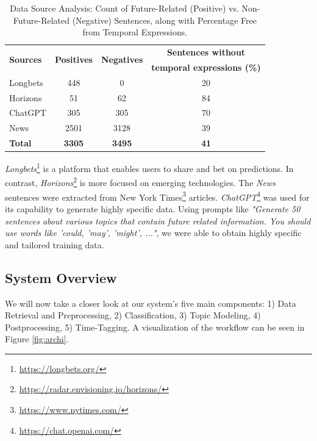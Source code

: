 \documentclass[sigconf]{acmart}
\begin{document}
\vspace*{-0.1cm}

\begin{table}[h]
  \begin{tabular}{lccc}
    \toprule
    \multirow{2}{*}{\textbf{Sources}} & \multirow{2}{*}{\textbf{Positives}} & \multirow{2}{*}{\textbf{Negatives}} & \textbf{Sentences without} \\
    & & & \textbf{temporal expressions (\%)} \\
    \midrule
    Longbets & 448 & 0 & 20 \\
    Horizons & 51 & 62 & 84 \\
    ChatGPT & 305 & 305 & 70 \\
    News & 2501 & 3128 & 39 \\
    \bottomrule
    \textbf{Total} & \textbf{3305} & \textbf{3495} & \textbf{41} \\
  \bottomrule
  \end{tabular}
  \caption{Data Source Analysis: Count of Future-Related (Positive) vs. Non-Future-Related (Negative) Sentences, along with Percentage Free from Temporal Expressions.}
  \label{tab:dataset}
\end{table}


\vspace*{-0.6cm}

\textit{Longbets}\footnote{\url{https://longbets.org/}} is a platform that enables users to share and bet on predictions. In contrast, \textit{Horizons}\footnote{\url{https://radar.envisioning.io/horizons/}} is more focused on emerging technologies. The \textit{News} sentences were extracted from New York Times\footnote{\url{https://www.nytimes.com/}} articles. \textit{ChatGPT}\footnote{\url{https://chat.openai.com/}} was used for its capability to generate highly specific data. Using prompts like \textit{"Generate 50 sentences about various topics that contain future related information. You should use words like ’could, ’may’, ’might’, ..."}, we were able to obtain highly specific and tailored training data.


\subsection{System Overview}
We will now take a closer look at our system's five main components: 1) Data Retrieval and Preprocessing, 2) Classification, 3) Topic Modeling, 4) Postprocessing, 5) Time-Tagging. A visualization of the workflow can be seen in Figure \ref{fig:archi}.
\end{document}
